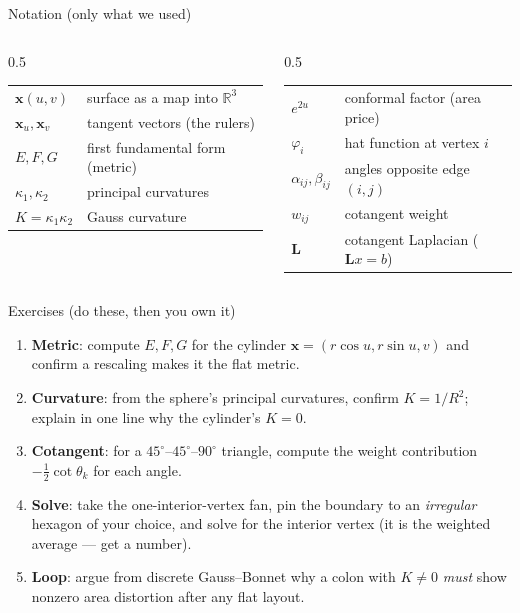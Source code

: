 \documentclass[aspectratio=169,10pt]{beamer}
\newcommand{\R}{\mathbb{R}}
\newcommand{\half}{\tfrac{1}{2}}
\newcommand{\xb}{\mathbf{x}}
\newcommand{\Lmat}{\mathbf{L}}
\begin{document}
\begin{frame}{Notation (only what we used)}
  \begin{columns}[T]
    \begin{column}{0.5\textwidth}
      \begin{tabular}{@{}ll@{}}
        $\xb(u,v)$ & surface as a map into $\R^3$\\
        $\xb_u,\xb_v$ & tangent vectors (the rulers)\\
        $E,F,G$ & first fundamental form (metric)\\
        $\kappa_1,\kappa_2$ & principal curvatures\\
        $K=\kappa_1\kappa_2$ & Gauss curvature\\
      \end{tabular}
    \end{column}
    \begin{column}{0.5\textwidth}
      \begin{tabular}{@{}ll@{}}
        $e^{2u}$ & conformal factor (area price)\\
        $\varphi_i$ & hat function at vertex $i$\\
        $\alpha_{ij},\beta_{ij}$ & angles opposite edge $(i,j)$\\
        $w_{ij}$ & cotangent weight\\
        $\Lmat$ & cotangent Laplacian ($\Lmat x=b$)\\
      \end{tabular}
    \end{column}
  \end{columns}
\end{frame}

\begin{frame}{Exercises (do these, then you own it)}
  \begin{enumerate}
    \item \textbf{Metric}: compute $E,F,G$ for the cylinder $\xb=(r\cos u,r\sin u,v)$ and confirm a rescaling makes it the flat metric.
    \item \textbf{Curvature}: from the sphere's principal curvatures, confirm $K=1/R^2$; explain in one line why the cylinder's $K=0$.
    \item \textbf{Cotangent}: for a $45^\circ$--$45^\circ$--$90^\circ$ triangle, compute the weight contribution $-\half\cot\theta_k$ for each angle.
    \item \textbf{Solve}: take the one-interior-vertex fan, pin the boundary to an \emph{irregular} hexagon of your choice, and solve for the interior vertex (it is the weighted average --- get a number).
    \item \textbf{Loop}: argue from discrete Gauss--Bonnet why a colon with $K\neq0$ \emph{must} show nonzero area distortion after any flat layout.
  \end{enumerate}
\end{frame}
\end{document}
